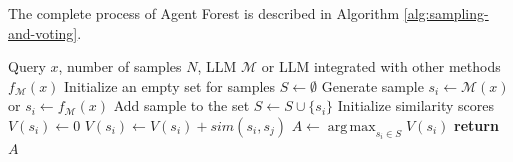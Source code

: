 The complete process of Agent Forest is described in Algorithm \ref{alg:sampling-and-voting}.

\begin{algorithm}[t!]
\caption{Agent Forest}
\begin{algorithmic}[1]
\REQUIRE Query $x$, number of samples $N$, LLM $\mathcal{M}$ or LLM integrated with other methods $f_{\mathcal{M}}(x)$
\STATE Initialize an empty set for samples $S \gets \emptyset$
    \STATE Generate sample $s_i \gets \mathcal{M}(x)$ or $s_i \gets f_{\mathcal{M}}(x)$
    \STATE Add sample to the set $S \gets S \cup \{s_i\}$
\ENDFOR
    \STATE Initialize similarity scores $V(s_i) \gets 0$
            \STATE $V(s_i) \gets V(s_i) + sim(s_i, s_j)$
        \ENDIF
    \ENDFOR
\ENDFOR
\STATE $A \gets \operatorname*{arg\,max}_{s_i \in S} V(s_i)$
\STATE \textbf{return} $A$
\label{alg:sampling-and-voting}
\end{algorithmic}
\end{algorithm}






